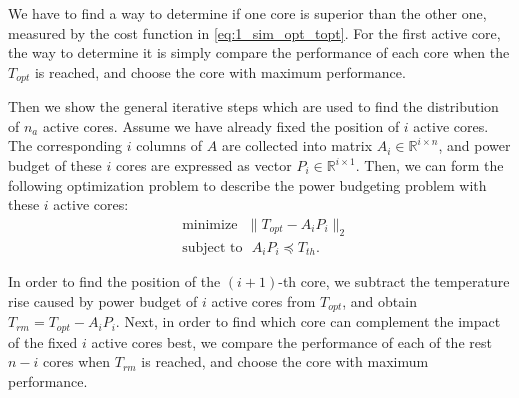 We have to find a way to determine if one core is superior than the other one, measured by the cost function in \eqref{eq:1_sim_opt_topt}. For the first active core, the way to determine it is simply compare the performance of each core when the $T_{opt}$ is reached, and choose the core with maximum performance.

Then we show the general iterative steps which are used to find the distribution of $n_{a}$ active cores. Assume we have already fixed the position of $i$ active cores. The corresponding $i$ columns of $A$ are collected into
matrix $A_i \in \mathbb{R}^{i \times n}$, and power budget of these $i$
cores are expressed as vector $P_i \in \mathbb{R}^{i \times 1}$. Then,
we can form the following optimization problem to describe the power
budgeting problem with these $i$ active cores:
\begin{equation}\label{eq:temp_ss_i_pb}
  \begin{split}
    &\text{minimize~~} \|T_{opt}-A_i P_i\|_2\\
    &\text{subject to~~} A_i P_i\preceq T_{th}.
  \end{split}
\end{equation}

In order to find the position of the $(i+1)$-th core, we subtract the
temperature rise caused by power budget of $i$ active cores from $T_{opt}$,
and obtain $T_{rm}=T_{opt}-A_iP_i$. Next, in order to find which core can complement the impact of the fixed $i$ active cores best, we compare the performance of each of the rest $n-i$ cores when $T_{rm}$ is reached, and choose the core with maximum performance.



